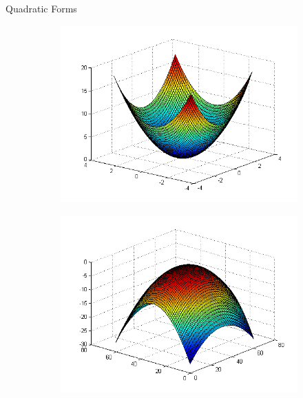 \documentclass[11pt, xcolor={dvipsnames}, hyperref={colorlinks, allcolors=Blue}]{beamer}
\begin{document}

\begin{frame}{Quadratic Forms}
\begin{figure}
	\begin{subfigure}[b]{0.45\textwidth}
		\centering
		\includegraphics[width=\textwidth]{quadraticform1}
	\end{subfigure}
	\begin{subfigure}[b]{0.45\textwidth}
		\centering
		\includegraphics[width=\textwidth]{quadraticform2}
	\end{subfigure}


\end{figure}
\end{frame}
\end{document}
